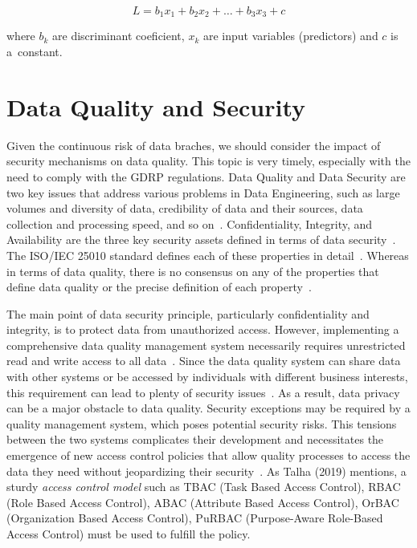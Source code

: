 \begin{equation*}
    L = b_1 x_1 + b_2 x_2 + \ldots + b_3 x_3 + c
\end{equation*}

where \( b_k \) are discriminant coeficient, \( x_k \) are input variables (predictors) and \( c \) is a~constant.

\section{Data Quality and Security}\label{sec:data-quality-and-security}

Given the continuous risk of data braches, we should consider the impact of security mechanisms on data quality.
This topic is very timely, especially with the need to comply with the GDRP regulations.
Data Quality and Data Security are two key issues that address various problems in Data Engineering, such as large volumes and diversity of data, credibility of data and their sources, data collection and processing speed, and so on~\cite{talha2019}.
Confidentiality, Integrity, and Availability are the three key security assets defined in terms of data security~\cite{talha2019}.
The ISO/IEC 25010 standard defines each of these properties in detail~\cite{iso25010}.
Whereas in terms of data quality, there is no consensus on any of the properties that define data quality or the precise definition of each property~\cite{batini2009}.

The main point of data security principle, particularly confidentiality and integrity, is to protect data from unauthorized access.
However, implementing a comprehensive data quality management system necessarily requires unrestricted read and write access to all data~\cite{talha2019}.
Since the data quality system can share data with other systems or be accessed by individuals with different business interests, this requirement can lead to plenty of security issues~\cite{talha2019}.
As a result, data privacy can be a major obstacle to data quality.
Security exceptions may be required by a quality management system, which poses potential security risks.
This tensions between the two systems complicates their development and necessitates the emergence of new access control policies that allow quality processes to access the data they need without jeopardizing their security~\cite{talha2019}.
As Talha (2019) mentions, a sturdy \textit{access control model} such as TBAC (Task Based Access Control), RBAC (Role Based Access Control), ABAC (Attribute Based Access Control), OrBAC (Organization Based Access Control), PuRBAC (Purpose-Aware Role-Based Access Control) must be used to fulfill the policy.

